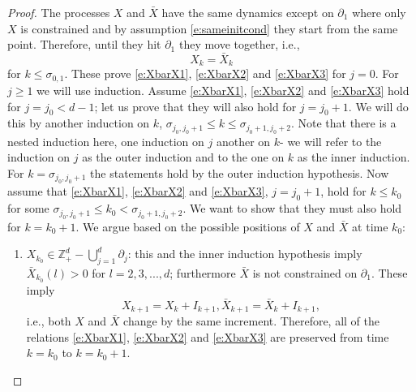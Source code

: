 \documentclass[11pt,a4paper]{article}
\begin{document}
\begin{proof}
The processes $X$ and $\bar{X}$ have the same dynamics except on $\partial_1$ where only $X$ is constrained and by assumption \eqref{e:sameinitcond}
 they start from the same point.
Therefore, until they hit $\partial_1$ they move together, i.e.,
\[
X_k = \bar{X}_k
\]
for $k \le \sigma_{0,1}.$ These prove \eqref{e:XbarX1}, \eqref{e:XbarX2}
and \eqref{e:XbarX3} for $j=0.$
For $j \ge 1$ we will use induction. Assume 
\eqref{e:XbarX1}, \eqref{e:XbarX2} and \eqref{e:XbarX3} 
hold for $j=j_0 < d-1$;
let us prove that they will also hold for $j=j_0 + 1.$ 
We will do this by another
induction on $k$,
$  \sigma_{j_0, j_0+1} \le k \le \sigma_{j_0 + 1, j_0 + 2}.$ 
Note that there is a nested induction here, one induction on $j$ another on
$k$- we will refer to the induction on $j$ as the outer induction
and to the one on $k$ as the inner induction.
For $k = \sigma_{j_0,j_0 + 1}$ the statements hold by the 
outer induction hypothesis.
Now assume that \eqref{e:XbarX1}, \eqref{e:XbarX2} and
\eqref{e:XbarX3}, $j=j_0 +1$, 
hold for $k \le k_0 $ for some $\sigma_{j_0,j_0+1} \le  k_0 < \sigma_{j_0+1,j_0+2}.$
We want to show that they must also hold for $k=k_0 + 1.$ We argue based on the possible positions of $X$ and $\bar{X}$
at time $k_0$:
\begin{enumerate}
\item $X_{k_0} \in {\mathbb Z}_+^d - \bigcup_{j=1}^d \partial_j$:
this and the inner induction hypothesis imply $\bar{X}_{k_0}(l) > 0$ for $l=2,3,...,d$;
furthermore $\bar{X}$ is not constrained on $\partial_1$. These imply
\[
X_{k+1} = X_k + I_{k+1}, \bar{X}_{k+1} = \bar{X}_k + I_{k+1},
\]
i.e., both $X$ and $\bar{X}$ change by the same increment. Therefore, 
all of the relations \eqref{e:XbarX1}, \eqref{e:XbarX2} and
\eqref{e:XbarX3}
are preserved from time $k=k_0$ to $k=k_0 + 1.$


\end{enumerate}
\end{proof}
\end{document}
